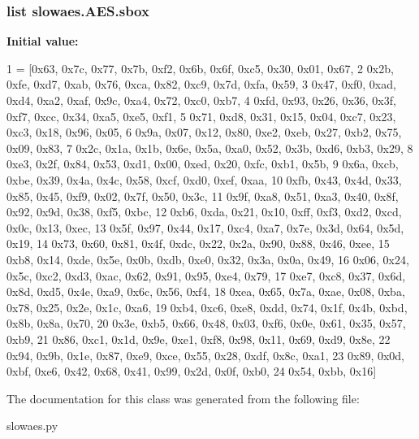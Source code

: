 \hypertarget{classslowaes_1_1_a_e_s_a584e03efd453993b40fef780984be0bb}{
\subsubsection[{sbox}]{\setlength{\rightskip}{0pt plus 5cm}list slowaes.\-A\-E\-S.\-sbox\hspace{0.3cm}{\ttfamily [static]}}}\label{classslowaes_1_1_a_e_s_a584e03efd453993b40fef780984be0bb}
{\bfseries Initial value\-:}
\begin{DoxyCode}
1 = [0x63, 0x7c, 0x77, 0x7b, 0xf2, 0x6b, 0x6f, 0xc5, 0x30, 0x01, 0x67,
2             0x2b, 0xfe, 0xd7, 0xab, 0x76, 0xca, 0x82, 0xc9, 0x7d, 0xfa, 0x59,
3             0x47, 0xf0, 0xad, 0xd4, 0xa2, 0xaf, 0x9c, 0xa4, 0x72, 0xc0, 0xb7,
4             0xfd, 0x93, 0x26, 0x36, 0x3f, 0xf7, 0xcc, 0x34, 0xa5, 0xe5, 0xf1,
5             0x71, 0xd8, 0x31, 0x15, 0x04, 0xc7, 0x23, 0xc3, 0x18, 0x96, 0x05,
6             0x9a, 0x07, 0x12, 0x80, 0xe2, 0xeb, 0x27, 0xb2, 0x75, 0x09, 0x83,
7             0x2c, 0x1a, 0x1b, 0x6e, 0x5a, 0xa0, 0x52, 0x3b, 0xd6, 0xb3, 0x29,
8             0xe3, 0x2f, 0x84, 0x53, 0xd1, 0x00, 0xed, 0x20, 0xfc, 0xb1, 0x5b,
9             0x6a, 0xcb, 0xbe, 0x39, 0x4a, 0x4c, 0x58, 0xcf, 0xd0, 0xef, 0xaa,
10             0xfb, 0x43, 0x4d, 0x33, 0x85, 0x45, 0xf9, 0x02, 0x7f, 0x50, 0x3c,
11             0x9f, 0xa8, 0x51, 0xa3, 0x40, 0x8f, 0x92, 0x9d, 0x38, 0xf5, 0xbc,
12             0xb6, 0xda, 0x21, 0x10, 0xff, 0xf3, 0xd2, 0xcd, 0x0c, 0x13, 0xec,
13             0x5f, 0x97, 0x44, 0x17, 0xc4, 0xa7, 0x7e, 0x3d, 0x64, 0x5d, 0x19,
14             0x73, 0x60, 0x81, 0x4f, 0xdc, 0x22, 0x2a, 0x90, 0x88, 0x46, 0xee,
15             0xb8, 0x14, 0xde, 0x5e, 0x0b, 0xdb, 0xe0, 0x32, 0x3a, 0x0a, 0x49,
16             0x06, 0x24, 0x5c, 0xc2, 0xd3, 0xac, 0x62, 0x91, 0x95, 0xe4, 0x79,
17             0xe7, 0xc8, 0x37, 0x6d, 0x8d, 0xd5, 0x4e, 0xa9, 0x6c, 0x56, 0xf4,
18             0xea, 0x65, 0x7a, 0xae, 0x08, 0xba, 0x78, 0x25, 0x2e, 0x1c, 0xa6,
19             0xb4, 0xc6, 0xe8, 0xdd, 0x74, 0x1f, 0x4b, 0xbd, 0x8b, 0x8a, 0x70,
20             0x3e, 0xb5, 0x66, 0x48, 0x03, 0xf6, 0x0e, 0x61, 0x35, 0x57, 0xb9,
21             0x86, 0xc1, 0x1d, 0x9e, 0xe1, 0xf8, 0x98, 0x11, 0x69, 0xd9, 0x8e,
22             0x94, 0x9b, 0x1e, 0x87, 0xe9, 0xce, 0x55, 0x28, 0xdf, 0x8c, 0xa1,
23             0x89, 0x0d, 0xbf, 0xe6, 0x42, 0x68, 0x41, 0x99, 0x2d, 0x0f, 0xb0,
24             0x54, 0xbb, 0x16]
\end{DoxyCode}


The documentation for this class was generated from the following file\-:\begin{DoxyCompactItemize}
\item 
slowaes.\-py\end{DoxyCompactItemize}
